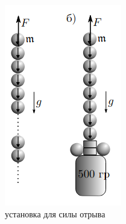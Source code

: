 \documentclass[a4paper, 10pt]{article}
\begin{document}
\begin{figure}[htbp]
\begin{subfigure}{0.2\textwidth}
            \includegraphics[width=\linewidth]{p2.png}
            \caption{установка для силы отрыва}
            \label{установка для силы отрыва}
        \end{subfigure}
        \hspace{2cm}
        \begin{subfigure}{0.2\textwidth}

\end{subfigure}
\end{figure}
\end{document}
